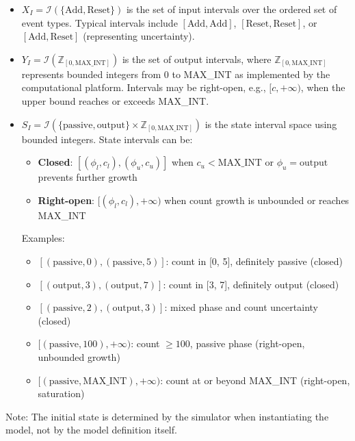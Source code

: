 \begin{itemize}
    \item $X_I = \mathcal{I}(\{\text{Add}, \text{Reset}\})$ is the set of input intervals over the ordered set of event types. Typical intervals include $[\text{Add}, \text{Add}]$, $[\text{Reset}, \text{Reset}]$, or $[\text{Add}, \text{Reset}]$ (representing uncertainty).
    
    \item $Y_I = \mathcal{I}(\mathbb{Z}_{[0, \text{MAX\_INT}]})$ is the set of output intervals, where $\mathbb{Z}_{[0, \text{MAX\_INT}]}$ represents bounded integers from 0 to MAX\_INT as implemented by the computational platform. Intervals may be right-open, e.g., $[c, +\infty)$, when the upper bound reaches or exceeds MAX\_INT.
    
    \item $S_I = \mathcal{I}(\{\text{passive}, \text{output}\} \times \mathbb{Z}_{[0, \text{MAX\_INT}]})$ is the state interval space using bounded integers. State intervals can be:
    \begin{itemize}
    \item \textbf{Closed}: $[(\phi_l, c_l), (\phi_u, c_u)]$ when $c_u < \text{MAX\_INT}$ or $\phi_u = \text{output}$ prevents further growth
    \item \textbf{Right-open}: $[(\phi_l, c_l), +\infty)$ when count growth is unbounded or reaches MAX\_INT
    \end{itemize}
    
    Examples:
    \begin{itemize}
    \item $[(\text{passive}, 0), (\text{passive}, 5)]$: count in [0, 5], definitely passive (closed)
    \item $[(\text{output}, 3), (\text{output}, 7)]$: count in [3, 7], definitely output (closed)
    \item $[(\text{passive}, 2), (\text{output}, 3)]$: mixed phase and count uncertainty (closed)
    \item $[(\text{passive}, 100), +\infty)$: count $\geq 100$, passive phase (right-open, unbounded growth)
    \item $[(\text{passive}, \text{MAX\_INT}), +\infty)$: count at or beyond MAX\_INT (right-open, saturation)
    \end{itemize}
\end{itemize}

Note: The initial state is determined by the simulator when instantiating the model, not by the model definition itself.

